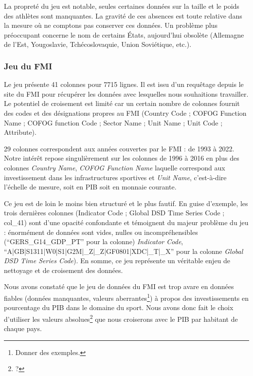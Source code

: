 \documentclass[hidelinks, 12pt]{article}
\begin{document}
La propreté du jeu est notable, seules certaines données sur la taille et le poids des athlètes sont manquantes. La gravité de ces absences est toute relative dans la mesure où ne comptons pas conserver ces données. Un problème plus préoccupant concerne le nom de certains États, aujourd'hui obsolète (Allemagne de l'Est, Yougoslavie, Tchécoslovaquie, Union Soviétique, etc.).





\subsubsection{Jeu du FMI}

Le jeu présente 41 colonnes pour 7715 lignes. Il est issu d'un requêtage depuis le site du FMI pour récupérer les données avec lesquelles nous souhaitions travailler. Le potentiel de croisement est limité car un certain nombre de colonnes fournit des codes et des désignations propres au FMI (Country Code ; COFOG Function Name ; COFOG function Code ; Sector Name ; Unit Name ; Unit Code ; Attribute).

29 colonnes correspondent aux années couvertes par le FMI : de 1993 à 2022. Notre intérêt repose singulièrement sur les colonnes de 1996 à 2016 en plus des colonnes \emph{Country Name}, \emph{COFOG Function Name} laquelle correspond aux investissement dans les infrastructures sportives et \emph{Unit Name}, c'est-à-dire l'échelle de mesure, soit en PIB soit en monnaie courante.

Ce jeu est de loin le moins bien structuré et le plus fautif. En guise d'exemple, les trois dernières colonnes (Indicator Code ; Global DSD Time Series Code ; col\_41) sont d'une opacité confondante et témoignent du majeur problème du jeu : énormément de données sont vides, nulles ou incompréhensibles (\enquote{GERS\_G14\_GDP\_PT} pour la colonne) \emph{Indicator Code}, \enquote{A|GB|S1311|W0|S1|G2M|\_Z|\_Z|GF0801|XDC|\_T|\_X} pour la colonne \emph{Global DSD Time Series Code}). En somme, ce jeu représente un véritable enjeu de nettoyage et de croisement des données.








Nous avons constaté que le jeu de données du FMI est trop avare en données fiables (données manquantes, valeurs aberrantes\footnote{Donner des exemples.}) à propos des investissements en pourcentage du PIB dans le domaine du sport. Nous avons donc fait le choix d'utiliser les valeurs absolues\footnote{?} que nous croiserons avec le PIB par habitant de chaque pays.
\end{document}
